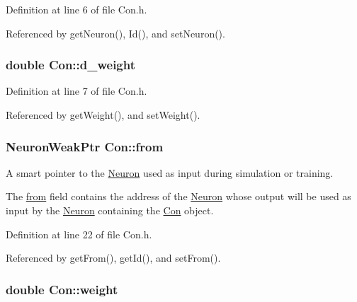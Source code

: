 Definition at line 6 of file Con.h.



Referenced by getNeuron(), Id(), and setNeuron().

\hypertarget{class_con_a41e043e0dfb126f3bdacbbd8caf33672}{
\subsubsection[{d\_\-weight}]{\setlength{\rightskip}{0pt plus 5cm}double {\bf Con::d\_\-weight}}}
\label{class_con_a41e043e0dfb126f3bdacbbd8caf33672}


Definition at line 7 of file Con.h.



Referenced by getWeight(), and setWeight().

\hypertarget{class_con_a7c05f90dff56fd26c1fa0f042bba67a6}{
\subsubsection[{from}]{\setlength{\rightskip}{0pt plus 5cm}NeuronWeakPtr {\bf Con::from}}}
\label{class_con_a7c05f90dff56fd26c1fa0f042bba67a6}


A smart pointer to the \hyperlink{class_neuron}{Neuron} used as input during simulation or training. 

The \hyperlink{class_con_a7c05f90dff56fd26c1fa0f042bba67a6}{from} field contains the address of the \hyperlink{class_neuron}{Neuron} whose output will be used as input by the \hyperlink{class_neuron}{Neuron} containing the \hyperlink{class_con}{Con} object. 

Definition at line 22 of file Con.h.



Referenced by getFrom(), getId(), and setFrom().

\hypertarget{class_con_a7f46485ba5b41971ea38641f9e7d1be0}{
\subsubsection[{weight}]{\setlength{\rightskip}{0pt plus 5cm}double {\bf Con::weight}}}
\label{class_con_a7f46485ba5b41971ea38641f9e7d1be0}


